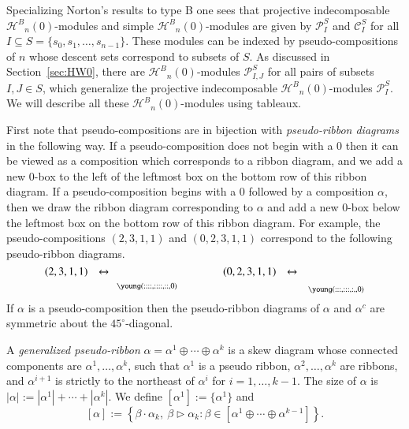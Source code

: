 \documentclass{amsart}
\newtheorem*{Young's Rule}{Young's Rule}
\theoremstyle{definition}
\theoremstyle{remark}
\numberwithin{equation}{section}
\begin{document}
Specializing Norton's results to type B one sees that projective indecomposable ${\mathcal{H}^B}_n(0)$-modules and simple ${\mathcal{H}^B}_n(0)$-modules are given by ${\mathcal{P}}_I^S$ and ${\mathcal{C}}_I^S$ for all $I\subseteq S = \{s_0,s_1,\ldots,s_{n-1}\}$. These modules can be indexed by pseudo-compositions of $n$ whose descent sets correspond to subsets of $S$. As discussed in Section~\ref{sec:HW0}, there are ${\mathcal{H}^B}_n(0)$-modules ${\mathcal{P}_{I,J}^S}$ for all pairs of subsets $I,J\in S$, which generalize the projective indecomposable ${\mathcal{H}^B}_n(0)$-modules ${\mathcal{P}}_I^S$. We will describe all these ${\mathcal{H}^B}_n(0)$-modules using tableaux.

First note that pseudo-compositions are in bijection with \emph{pseudo-ribbon diagrams} in the following way. If a pseudo-composition does not begin with a $0$ then it can be viewed as a composition which corresponds to a ribbon diagram, and we add a new 0-box to the left of the leftmost box on the bottom row of this ribbon diagram. If a pseudo-composition begins with a $0$ followed by a composition $\alpha$, then we draw the ribbon diagram corresponding to $\alpha$ and add a new $0$-box below the leftmost box on the bottom row of this ribbon diagram. For example, the pseudo-compositions $(2,3,1,1)$ and $(0,2,3,1,1)$ correspond to the following pseudo-ribbon diagrams.
\[ \scriptsize
{(2,3,1,1) \quad \leftrightarrow \quad} \raisebox{-12pt}{\young(::::\hfill,::::\hfill,::\hfill\hfill\hfill,0\hfill\hfill)}
\qquad\qquad\qquad 
(0,2,3,1,1) \quad \leftrightarrow \quad \raisebox{-15pt}{\young(:::\hfill,:::\hfill,:\hfill\hfill\hfill,\hfill\hfill,0)} \]
If $\alpha$ is a pseudo-composition then the pseudo-ribbon diagrams of $\alpha$ and $\alpha^c$ are symmetric about the $45^\circ$-diagonal. 

A \emph{generalized pseudo-ribbon} $\alpha=\alpha^1\oplus\cdots\oplus\alpha^k$ is a skew diagram whose connected components are $\alpha^1,\ldots,\alpha^k$, such that $\alpha^1$ is a pseudo ribbon, $\alpha^2,\ldots,\alpha^k$ are ribbons, and $\alpha^{i+1}$ is strictly to the northeast of $\alpha^i$ for $i=1,\ldots,k-1$. The size of $\alpha$ is $|\alpha|:=|\alpha^1|+\cdots+|\alpha^k|$. We define $[\alpha^1]:=\{\alpha^1\}$ and 
\[ [\alpha] := \left\{ \beta \cdot \alpha_k,\ \beta\rhd \alpha_k : \beta\in [\alpha^1\oplus\cdots\oplus\alpha^{k-1}] \right\}. \]
\end{document}
